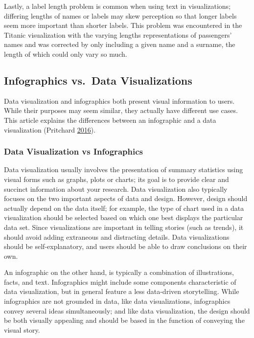 \documentclass[]{book}
\begin{document}
Lastly, a label length problem is common when using text in
visualizations; differing lengths of names or labels may skew perception
so that longer labels seem more important than shorter labels. This
problem was encountered in the Titanic visualization with the varying
lengths representations of passengers' names and was corrected by only
including a given name and a surname, the length of which could only
vary so much.

\subsection{Infographics vs.~Data
Visualizations}\label{infographics-vs.data-visualizations-1}

Data visualization and infographics both present visual information to
users. While their purposes may seem similar, they actually have
different use cases. This article explains the differences between an
infographic and a data visualization (Pritchard
\protect\hyperlink{ref-VIZVSINFO}{2016}).

\subsubsection{Data Visualization vs
Infographics}\label{data-visualization-vs-infographics}

Data visualization usually involves the presentation of summary
statistics using visual forms such as graphs, plots or charts; its goal
is to provide clear and succinct information about your research. Data
visualization also typically focuses on the two important aspects of
data and design. However, design should actually depend on the data
itself; for example, the type of chart used in a data visualization
should be selected based on which one best displays the particular data
set. Since visualizations are important in telling stories (such as
trends), it should avoid adding extraneous and distracting details. Data
visualizations should be self-explanatory, and users should be able to
draw conclusions on their own.

An infographic on the other hand, is typically a combination of
illustrations, facts, and text. Infographics might include some
components characteristic of data visualization, but in general feature
a less data-driven storytelling. While infographics are not grounded in
data, like data visualizations, infographics convey several ideas
simultaneously; and like data visualization, the design should be both
visually appealing and should be based in the function of conveying the
visual story.
\end{document}
